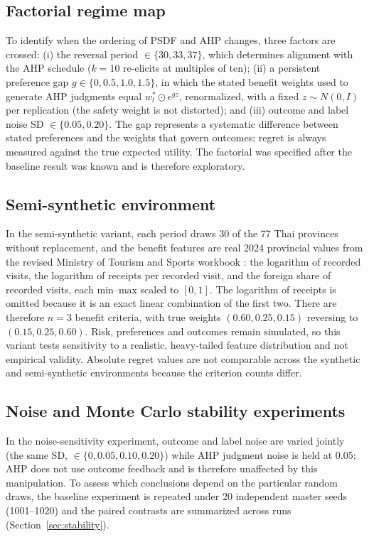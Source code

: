 \documentclass[12pt,a4paper]{article}
\begin{document}
\subsection{Factorial regime map}\label{sec:factorial}
To identify when the ordering of PSDF and AHP changes, three factors are crossed: (i) the reversal period $\in\{30,33,37\}$, which determines alignment with the AHP schedule ($k=10$ re-elicits at multiples of ten); (ii) a persistent preference gap $g\in\{0,0.5,1.0,1.5\}$, in which the stated benefit weights used to generate AHP judgments equal $w^*_t\odot e^{gz}$, renormalized, with a fixed $z\sim N(0,I)$ per replication (the safety weight is not distorted); and (iii) outcome and label noise SD $\in\{0.05,0.20\}$. The gap represents a systematic difference between stated preferences and the weights that govern outcomes; regret is always measured against the true expected utility. The factorial was specified after the baseline result was known and is therefore exploratory.

\subsection{Semi-synthetic environment}
In the semi-synthetic variant, each period draws 30 of the 77 Thai provinces without replacement, and the benefit features are real 2024 provincial values from the revised Ministry of Tourism and Sports workbook \citep{mots2025}: the logarithm of recorded visits, the logarithm of receipts per recorded visit, and the foreign share of recorded visits, each min--max scaled to $[0,1]$. The logarithm of receipts is omitted because it is an exact linear combination of the first two. There are therefore $n=3$ benefit criteria, with true weights $(0.60,0.25,0.15)$ reversing to $(0.15,0.25,0.60)$. Risk, preferences and outcomes remain simulated, so this variant tests sensitivity to a realistic, heavy-tailed feature distribution and not empirical validity. Absolute regret values are not comparable across the synthetic and semi-synthetic environments because the criterion counts differ.

\subsection{Noise and Monte Carlo stability experiments}
In the noise-sensitivity experiment, outcome and label noise are varied jointly (the same SD, $\in\{0,0.05,0.10,0.20\}$) while AHP judgment noise is held at 0.05; AHP does not use outcome feedback and is therefore unaffected by this manipulation. To assess which conclusions depend on the particular random draws, the baseline experiment is repeated under 20 independent master seeds (1001--1020) and the paired contrasts are summarized across runs (Section~\ref{sec:stability}).
\end{document}
